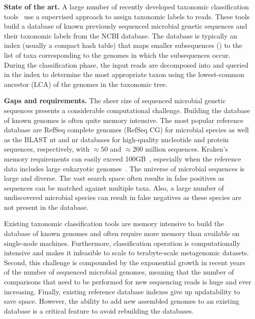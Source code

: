 \noindent
\textbf{State of the art.}
A large number of recently developed taxonomic classification tools~\cite{ames2013scalable, kim2016centrifuge, menzel2016fast, wood2014kraken, wood2019improved, dilthey2019strain,liu2018novel} use a supervised approach to assign taxonomic labels to reads.
These tools build a database of known previously sequenced microbial genetic sequences and their taxonomic labels from the NCBI database.
The database is typically an index (usually a compact hash table) that maps smaller subsequences (\kmers) to the list of taxa corresponding to the genomes in which the subsequences occur.
During the classification phase, the input reads are decomposed into \kmers and queried in the index to determine the most appropriate taxon using the lowest-common ancestor (LCA) of the genomes in the taxonomic tree.

\noindent
\textbf{Gaps and requirements.}
The sheer size of sequenced microbial genetic sequences presents a considerable computational challenge.
Building the database of known genomes is often quite memory intensive.
The most popular reference database are RefSeq complete genomes (RefSeq CG) for microbial species as well as the BLAST nt and nr databases for high-quality nucleotide and protein sequences, respectively, with $\approx50$ and $\approx200$ million sequences.
Kraken's~\cite{wood2014kraken} memory requirements can easily exceed 100GB~\cite{simon2019benchmarking}, especially when the reference data includes large eukaryotic genomes~\cite{meiser2017sequencing, knutson2017porcine}.
%
The universe of microbial sequences is large and diverse. The vast search space often results in false positives as sequences can be matched against multiple taxa. Also, a large number of undiscovered microbial species can result in false negatives as these species are not present in the database.

Existing taxonomic classification tools are memory intensive to build the database of known genomes and often require more memory than available on single-node machines. Furthermore, classification operation is computationally intensive and makes it infeasible to scale to terabyte-scale metagenomic datasets.
Second, this challenge is compounded by the exponential growth in recent years of the number of sequenced microbial genomes, meaning that the number of comparisons that need to be performed for new sequencing reads is huge and ever increasing.
%
Finally, existing reference database indexes give up updatability to save space. However, the ability to add new assembled genomes to an existing database is a critical feature to avoid rebuilding the databases.


